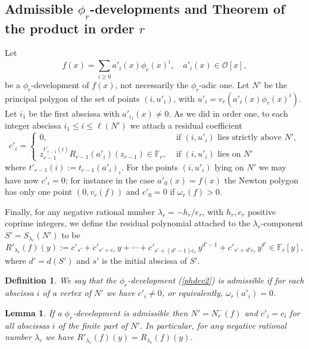 \documentclass{amsart}
\newtheorem{lemma}[theorem]{Lemma}
\newtheorem{definition}[theorem]{Definition}
\def\as#1{\renewcommand\arraystretch{#1}}
\def\ff#1{\mathbb{F}_{#1}}
\def\la{\lambda}
\def\om{\omega}
\def\oo{{\mathcal O}}
\def\zpx{\oo[x]}
\begin{document}
\subsection{Admissible $\phi_r$-developments and Theorem of the product in order $r$}
Let
\begin{equation}\label{phdev2}
f(x)=\sum_{i\ge 0}a'_i(x)\phi_r(x)^i,\quad a'_i(x)\in\zpx,
\end{equation}
be a $\phi_r$-development of $f(x)$, not necessarily the $\phi_r$-adic
one. Let $N'$ be the
principal polygon of the set of points $(i,u'_i)$, with $u'_i=v_r(a'_i(x)\phi_r(x)^i)$. Let $i_1$ be the first abscissa with $a'_{i_1}(x)\ne0$. As we did in order one, to each integer abscissa $i_1\le i\le\ell(N')$ we attach a residual coefficient
$$\as{1.6}
c'_i=\left\{\begin{array}{ll}
0,&\mbox{ if $(i,u'_i)$ lies strictly above }N',\\z_{r-1}^{t'_{r-1}(i)}R_{r-1}(a'_i)(z_{r-1})\in\ff{r},&\mbox{ if $(i,u'_i)$ lies on }N'
\end{array}
\right.
$$ 
where $t'_{r-1}(i):=t_{r-1}(a'_i)_i$. 
For the points $(i,u'_i)$ lying on $N'$ we may have now $c'_i=0$; for instance in the case $a'_0(x)=f(x)$ the Newton polygon has only one point $(0,v_r(f))$ and $c'_0=0$ if $\om_r(f)>0$. 

Finally, for any negative rational number $\la_r=-h_r/e_r$, with $h_r,e_r$ positive coprime integers, we define the 
residual polynomial attached to the $\la_r$-component $S'=S_{\la_r}(N')$ to be
$$R'_{\la_r}(f)(y):=c'_{s'}+c'_{s'+e_r}\,y+\cdots+c'_{s'+(d'-1)e_r}\,y^{d'-1}+c'_{s'+d'e_r}\,y^{d'}\in\ff{r}[y],$$
where $d'=d(S')$ and $s'$ is the initial abscissa of $S'$.

\begin{definition}
We say that the $\phi_r$-development (\ref{phdev2}) is admissible if
for each abscissa $i$ of a vertex of $N'$
we have $c'_i\ne0$, or equivalently, $\om_r(a'_i)=0$.
\end{definition}

\begin{lemma}\label{admissible2}
If a $\phi_r$-development is admissible then
$N'=N_r^-(f)$ and $c'_i=c_i$ for all abscissas $i$ of the finite part of $N'$. In particular, for any negative rational number $\la_r$ we have $R'_{\la_r}(f)(y)=R_{\la_r}(f)(y)$.
\end{lemma}
\end{document}

